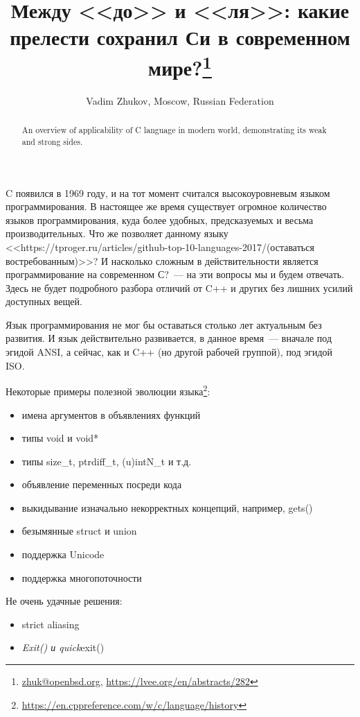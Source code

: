 \documentclass[10pt, a5paper]{article}
\begin{document}
\title{Между <<до>> и <<ля>>: какие прелести сохранил Си в современном мире?\footnote{\url{zhuk@openbsd.org}, \url{https://lvee.org/en/abstracts/282}}}
\author{Vadim Zhukov, Moscow, Russian Federation}
\maketitle
\begin{abstract}
An overview of applicability of C language in modern world, demonstrating its weak and strong sides.
\end{abstract}
C появился в 1969 году, и на тот момент считался высокоуровневым языком программирования. В настоящее же время существует огромное количество языков программирования, куда более удобных, предсказуемых и весьма производительных. Что же позволяет данному языку <<https://tproger.ru/articles/github-top-10-languages-2017/(оставаться востребованным)>>? И насколько сложным в действительности является программирование на современном С?~--- на эти вопросы мы и будем отвечать. Здесь не будет подробного разбора отличий от C++ и других без лишних усилий доступных вещей.

Язык программирования не мог бы оставаться столько лет актуальным без развития. И язык действительно развивается, в данное время~--- вначале под эгидой ANSI, а сейчас, как и C++ (но другой рабочей группой), под эгидой ISO.

Некоторые примеры полезной эволюции языка\footnote{\url{https://en.cppreference.com/w/c/language/history}}:

\begin{itemize}
  \item имена аргументов в объявлениях функций
  \item типы void и void*
  \item типы size\_t, ptrdiff\_t, (u)intN\_t и т.д.
  \item объявление переменных посреди кода
  \item выкидывание изначально некорректных концепций, например, gets()
  \item безымянные struct и union
  \item поддержка Unicode
  \item поддержка многопоточности
\end{itemize}

Не очень удачные решения:

\begin{itemize}
  \item strict aliasing
  \item \emph{Exit() и quick}exit()
\end{itemize}
\end{document}
